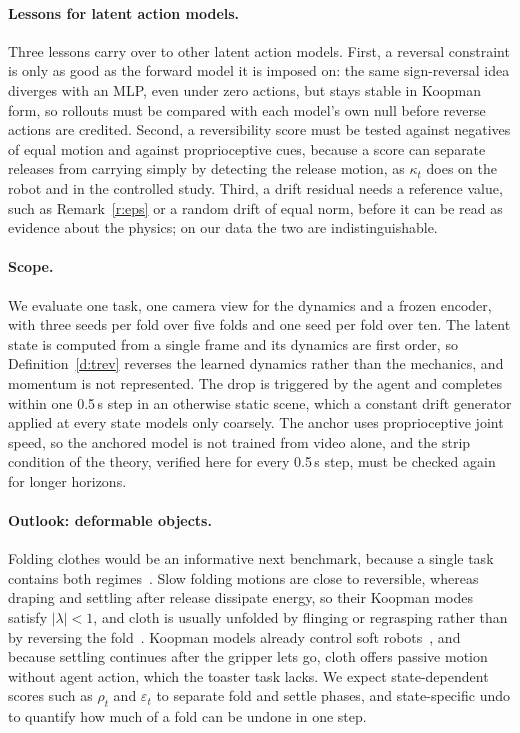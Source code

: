 \documentclass{jcse}
\begin{document}
\paragraph{Lessons for latent action models.}
Three lessons carry over to other latent action models. First, a reversal constraint is only as good as the forward model it is imposed on: the same sign-reversal idea diverges with an MLP, even under zero actions, but stays stable in Koopman form, so rollouts must be compared with each model's own null before reverse actions are credited.
Second, a reversibility score must be tested against negatives of equal motion and against proprioceptive cues, because a score can separate releases from carrying simply by detecting the release motion, as $\kappa_t$ does on the robot and in the controlled study.
Third, a drift residual needs a reference value, such as Remark~\ref{r:eps} or a random drift of equal norm, before it can be read as evidence about the physics; on our data the two are indistinguishable.

\paragraph{Scope.}
We evaluate one task, one camera view for the dynamics and a frozen encoder, with three seeds per fold over five folds and one seed per fold over ten.
The latent state is computed from a single frame and its dynamics are first order, so Definition~\ref{d:trev} reverses the learned dynamics rather than the mechanics, and momentum is not represented.
The drop is triggered by the agent and completes within one 0.5\,s step in an otherwise static scene, which a constant drift generator applied at every state models only coarsely.
The anchor uses proprioceptive joint speed, so the anchored model is not trained from video alone, and the strip condition of the theory, verified here for every 0.5\,s step, must be checked again for longer horizons.

\paragraph{Outlook: deformable objects.}
Folding clothes would be an informative next benchmark, because a single task contains both regimes~\cite{lin2020softgym,lin2021vcd}.
Slow folding motions are close to reversible, whereas draping and settling after release dissipate energy, so their Koopman modes satisfy $|\lambda|<1$, and cloth is usually unfolded by flinging or regrasping rather than by reversing the fold~\cite{ha2021flingbot,avigal2022speedfolding}.
Koopman models already control soft robots~\cite{bruder2019soft}, and because settling continues after the gripper lets go, cloth offers passive motion without agent action, which the toaster task lacks. We expect state-dependent scores such as $\rho_t$ and $\varepsilon_t$ to separate fold and settle phases, and state-specific undo to quantify how much of a fold can be undone in one step.
\end{document}
